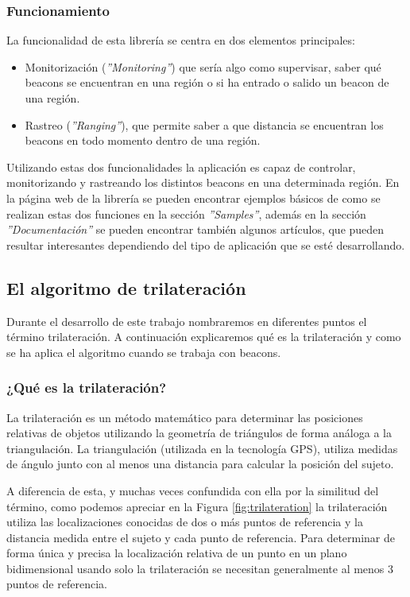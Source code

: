 \subsubsection{Funcionamiento}

La funcionalidad de esta librería se centra en dos elementos principales: 

\begin{itemize}
\item Monitorización (\textit{''Monitoring''}) que sería algo como supervisar, saber qué beacons se encuentran en una región o si ha entrado o salido un beacon de una región.
\item Rastreo (\textit{''Ranging''}), que permite saber a que distancia se encuentran los beacons en todo momento dentro de una región.
\end{itemize}

Utilizando estas dos funcionalidades la aplicación es capaz de controlar, monitorizando y rastreando los distintos beacons en una determinada región. En la página web de la librería \cite{URL::altbeaconSamples} se pueden encontrar ejemplos básicos de como se realizan estas dos funciones en la sección \textit{''Samples''}, además en la sección \textit{''Documentación''} se pueden encontrar también algunos artículos, que pueden resultar interesantes dependiendo del tipo de aplicación que se esté desarrollando.


\subsection{El algoritmo de trilateración}


Durante el desarrollo de este trabajo nombraremos en diferentes puntos el término trilateración. A continuación explicaremos qué es la trilateración y como se ha aplica el algoritmo cuando se trabaja con beacons.

\subsubsection{¿Qué es la trilateración?}


La trilateración es un método matemático para determinar las posiciones relativas de objetos utilizando la geometría de triángulos de forma análoga a la triangulación. La triangulación (utilizada en la tecnología GPS), utiliza medidas de ángulo junto con al menos una distancia para calcular la posición del sujeto. 


A diferencia de esta, y muchas veces confundida con ella por la similitud del término, como podemos apreciar en la Figura \ref{fig:trilateration} la trilateración utiliza las localizaciones conocidas de dos o más puntos de referencia y la distancia medida entre el sujeto y cada punto de referencia. Para determinar de forma única y precisa la localización relativa de un punto en un plano bidimensional usando solo la trilateración se necesitan generalmente al menos 3 puntos de referencia.

